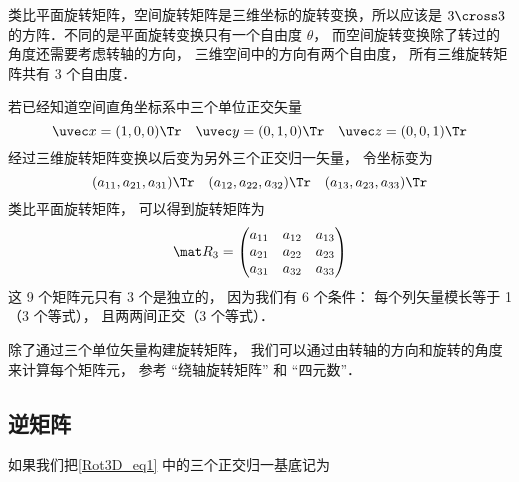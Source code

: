 


类比平面旋转矩阵，空间旋转矩阵是三维坐标的旋转变换，所以应该是 $3 \cross 3$ 的方阵．不同的是平面旋转变换只有一个自由度 $\theta $， 而空间旋转变换除了转过的角度还需要考虑转轴的方向， 三维空间中的方向有两个自由度， 所有三维旋转矩阵共有 3 个自由度．

若已经知道空间直角坐标系中三个单位正交矢量
\begin{equation}
\uvec x=(1,0,0)\Tr \quad \uvec y=(0,1,0)\Tr \quad \uvec z=(0,0,1)\Tr
\end{equation}
经过三维旋转矩阵变换以后变为另外三个正交归一矢量， 令坐标变为 
\begin{equation}\label{Rot3D_eq1}
({a_{11}},{a_{21}},{a_{31}})\Tr \quad ({a_{12}},{a_{22}},{a_{32}})\Tr \quad ({a_{13}},{a_{23}},{a_{33}})\Tr
\end{equation}
类比平面旋转矩阵， 可以得到旋转矩阵为
\begin{equation}
\mat R_3 = \begin{pmatrix}
{a_{11}}&{a_{12}}&{a_{13}}\\
{a_{21}}&{a_{22}}&{a_{23}}\\
{a_{31}}&{a_{32}}&{a_{33}}
\end{pmatrix}\end{equation}
这 9 个矩阵元只有 3 个是独立的， 因为我们有 6 个条件： 每个列矢量模长等于 1（3 个等式）， 且两两间正交（3 个等式）．

除了通过三个单位矢量构建旋转矩阵， 我们可以通过由转轴的方向和旋转的角度来计算每个矩阵元， 参考 “绕轴旋转矩阵” 和 “四元数”．

\subsection{逆矩阵}
如果我们把\autoref{Rot3D_eq1} 中的三个正交归一基底记为 


